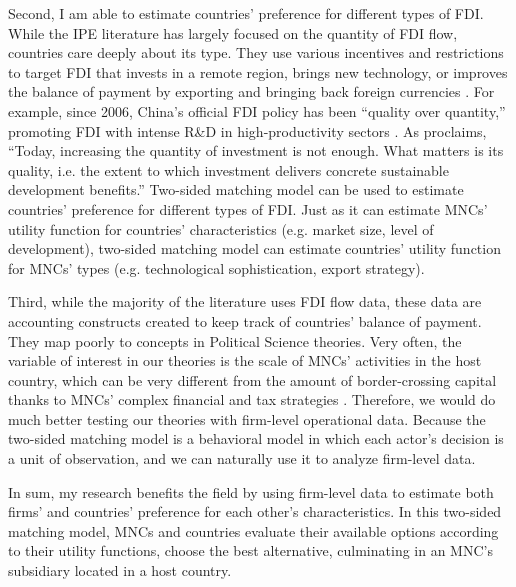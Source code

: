 Second, I am able to estimate countries' preference for different types of
FDI. While the IPE literature has largely focused on the quantity of FDI flow,
countries care deeply about its type. They use various incentives and
restrictions to target FDI that invests in a remote region, brings new
technology, or improves the balance of payment by exporting and bringing back
foreign currencies \citep{Ricupero2000}. For example, since 2006, China's
official FDI policy has been ``quality over quantity,'' promoting FDI with
intense R\&D in high-productivity sectors \citep{Guangzhou2011}. As
\citet{UNCTAD2015} proclaims, ``Today, increasing the quantity of investment is
not enough. What matters is its quality, i.e. the extent to which investment
delivers concrete sustainable development benefits.'' Two-sided matching model
can be used to estimate countries' preference for different types of FDI. Just
as it can estimate MNCs' utility function for countries' characteristics (e.g.
market size, level of development), two-sided matching model can estimate
countries' utility function for MNCs' types (e.g. technological sophistication,
export strategy).

Third, while the majority of the literature uses FDI flow data, these data are
accounting constructs created to keep track of countries' balance of payment.
They map poorly to concepts in Political Science theories. Very often, the
variable of interest in our theories is the scale of MNCs' activities in the
host country, which can be very different from the amount of border-crossing
capital thanks to MNCs' complex financial and tax strategies \citep{Kerner2014}.
Therefore, we would do much better testing our theories with firm-level
operational data. Because the two-sided matching model is a behavioral model in
which each actor's decision is a unit of observation, and we can naturally use
it to analyze firm-level data.

In sum, my research benefits the field by using firm-level data to estimate
both firms' and countries' preference for each other's characteristics. In this
two-sided matching model, MNCs and countries evaluate their available options
according to their utility functions, choose the best alternative, culminating
in an MNC's subsidiary located in a host country.

